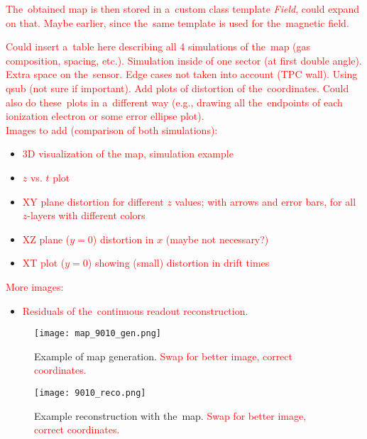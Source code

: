 		\textcolor{red}{The~obtained map is then stored in a~custom class template \textit{Field}, could expand on that. Maybe earlier, since the~same template is used for the~magnetic field.}
		
		\textcolor{red}{Could insert a~table here describing all 4 simulations of the~map (gas composition, spacing, etc.). Simulation inside of one sector (at first double angle). Extra space on the~sensor. Edge cases not taken into account (TPC wall). Using qsub (not sure if important). Add plots of distortion of the~coordinates. Could also do these~plots in a~different way (e.g., drawing all the~endpoints of each ionization electron or some error ellipse plot).}\\
		
		\noindent\textcolor{red}{Images to add (comparison of both simulations):}
		\begin{itemize}[topsep=4pt,itemsep=2pt]
			\item \textcolor{red}{3D visualization of the map, simulation example}
			\item \textcolor{red}{$z$ vs. $t$ plot}
			\item \textcolor{red}{XY plane distortion for different $z$ values; with arrows and error bars, for all $z$-layers with different colors}
			\item \textcolor{red}{XZ plane ($y = 0$) distortion in $x$ (maybe not necessary?)}
			\item \textcolor{red}{XT plot ($y = 0$) showing (small) distortion in drift times}\\
		\end{itemize}
		
		\noindent\textcolor{red}{More images:}
		\begin{itemize}[topsep=4pt,itemsep=2pt]
			\item \textcolor{red}{Residuals of the~continuous readout reconstruction.}
		\end{itemize}		
		
		\begin{figure}[H]
			\centering
			\texttt{[image: map\_9010\_gen.png]}
			\caption{Example of map generation. \textcolor{red}{Swap for better image, correct coordinates.}}
			\label{fig:map9010gen}
		\end{figure}
		
		\begin{figure}[H]
			\centering
			\texttt{[image: 9010\_reco.png]}
			\caption{Example reconstruction with the~map. \textcolor{red}{Swap for better image, correct coordinates.}}
			\label{fig:9010reco}
		\end{figure}
		
